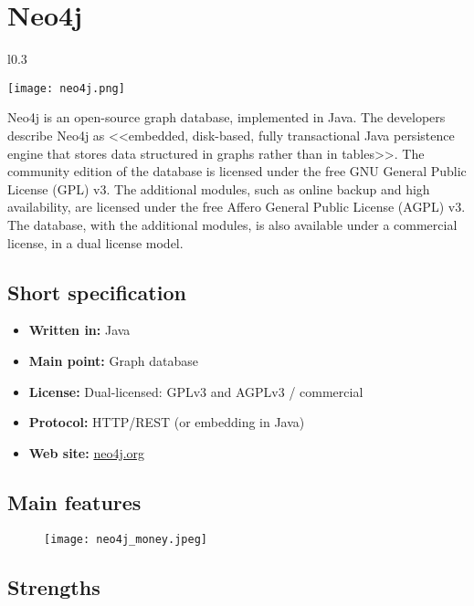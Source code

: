 \chapter{Neo4j}

\begin{wrapfigure}{l}{0.3\textwidth}
  \vspace{-75pt}
  \begin{center}
    \texttt{[image: neo4j.png]}
  \end{center}
  \vspace{-30pt}
\end{wrapfigure}
Neo4j is an open-source graph database, implemented in Java. The developers describe Neo4j as <<embedded, disk-based, fully transactional Java persistence engine that stores data structured in graphs rather than in tables>>. The community edition of the database is licensed under the free GNU General Public License (GPL) v3. The additional modules, such as online backup and high availability, are licensed under the free Affero General Public License (AGPL) v3. The database, with the additional modules, is also available under a commercial license, in a dual license model.

\section{Short specification}

\begin{itemize}
  \item \textbf{Written in:} Java
  \item \textbf{Main point:} Graph database
  \item \textbf{License:} Dual-licensed: GPLv3 and AGPLv3 / commercial
  \item \textbf{Protocol:} HTTP/REST (or embedding in Java)
  \item \textbf{Web site:} \href{http://neo4j.org/}{neo4j.org}
\end{itemize}

\section{Main features}

\begin{figure}[hb]
  \centering
  \texttt{[image: neo4j\_money.jpeg]}
\end{figure}

\section{Strengths}

